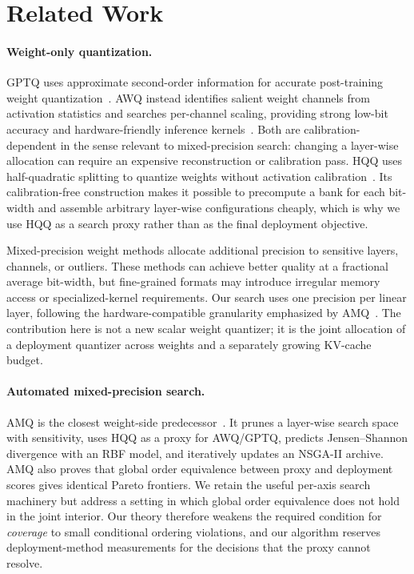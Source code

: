 \section{Related Work}
\label{sec:related}

\paragraph{Weight-only quantization.}
GPTQ uses approximate second-order information for accurate post-training
weight quantization~\citep{frantar2023gptq}.  AWQ instead identifies salient
weight channels from activation statistics and searches per-channel scaling,
providing strong low-bit accuracy and hardware-friendly inference
kernels~\citep{lin2024awq}.  Both are calibration-dependent in the sense relevant
to mixed-precision search: changing a layer-wise allocation can require an
expensive reconstruction or calibration pass.  HQQ uses half-quadratic splitting
to quantize weights without activation calibration~\citep{badri2023hqq}.  Its
calibration-free construction makes it possible to precompute a bank for each
bit-width and assemble arbitrary layer-wise configurations cheaply, which is why
we use HQQ as a search proxy rather than as the final deployment objective.

Mixed-precision weight methods allocate additional precision to sensitive
layers, channels, or outliers.  These methods can achieve better quality at a
fractional average bit-width, but fine-grained formats may introduce irregular
memory access or specialized-kernel requirements.  Our search uses one precision
per linear layer, following the hardware-compatible granularity emphasized by
AMQ~\citep{lee2025amq}.  The contribution here is not a new scalar weight
quantizer; it is the joint allocation of a deployment quantizer across weights
and a separately growing KV-cache budget.

\paragraph{Automated mixed-precision search.}
AMQ is the closest weight-side predecessor~\citep{lee2025amq}.  It prunes a
layer-wise search space with sensitivity, uses HQQ as a proxy for AWQ/GPTQ,
predicts Jensen--Shannon divergence with an RBF model, and iteratively updates an
NSGA-II archive.  AMQ also proves that global order equivalence between proxy and
deployment scores gives identical Pareto frontiers.  We retain the useful
per-axis search machinery but address a setting in which global order equivalence
does not hold in the joint interior.  Our theory therefore weakens the required
condition for \emph{coverage} to small conditional ordering violations, and our
algorithm reserves deployment-method measurements for the decisions that the
proxy cannot resolve.

